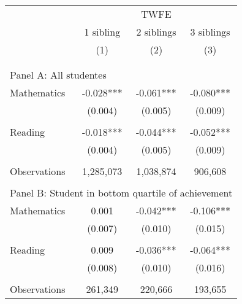 \makeatletter
{}
{
\makeatother
\begin{tabular}{lccc}
\toprule
\cmidrule(lr){2-4}
& \multicolumn{3}{c}{TWFE} \\
\cmidrule(lr){2-4}
& 1 sibling & 2 siblings & 3 siblings  \\
\cmidrule(lr){2-2} \cmidrule(lr){3-3} \cmidrule(lr){4-4}
& (1) & (2) & (3)\\
\bottomrule
&  &  &  \\
&  &  &   \\
\multicolumn{4}{l}{Panel A: All studentes } \\
\hspace{3mm}Mathematics&      -0.028***&      -0.061***&      -0.080***\\
                    &     (0.004)   &     (0.005)   &     (0.009)   \\
 
&  &  &   \\
\hspace{3mm}Reading &      -0.018***&      -0.044***&      -0.052***\\
                    &     (0.004)   &     (0.005)   &     (0.009)   \\
                    &               &               &               \\
\hspace{3mm}Observations&   1,285,073   &   1,038,874   &     906,608   \\
 
&  &  &   \\
\multicolumn{4}{l}{Panel B: Student in bottom quartile of achievement} \\
\hspace{3mm}Mathematics&       0.001   &      -0.042***&      -0.106***\\
                    &     (0.007)   &     (0.010)   &     (0.015)   \\
 
&  &  &   \\
\hspace{3mm}Reading &       0.009   &      -0.036***&      -0.064***\\
                    &     (0.008)   &     (0.010)   &     (0.016)   \\
                    &               &               &               \\
\hspace{3mm}Observations&     261,349   &     220,666   &     193,655   \\
 

\end{tabular}}
